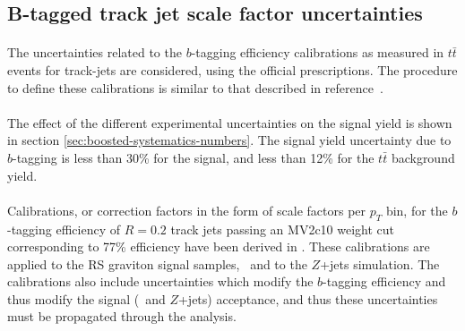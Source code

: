 \subsection{B-tagged track jet scale factor uncertainties}
\label{sec:b-tagging-unc}

\paragraph{}
The uncertainties related to the $b$-tagging efficiency calibrations as measured in $t\bar{t}$ events for track-jets are considered, using the official prescriptions. 
The procedure to define these calibrations is similar to that described in reference~\cite{Aad:2015ydr}.

\paragraph{}
The effect of the different experimental uncertainties on the signal yield is shown in section \ref{sec:boosted-systematics-numbers}. 
The signal yield uncertainty due to $b$-tagging is less than 30\% for the signal, and less than 12\% for the $t\bar{t}$ background yield.

\paragraph{}
Calibrations, or correction factors in the form of scale factors per $p_{T}$ bin, for the $b$-tagging efficiency of $R=0.2$ track jets passing an MV2c10 weight cut corresponding to 77\% efficiency have been derived in \cite{ATL-COM-PHYS-2015-009,ATL-COM-PHYS-2015-1323}.  These calibrations are applied to the RS graviton signal samples, \ttbar\ and to the $Z$+jets simulation.  The calibrations also include uncertainties which modify the $b$-tagging efficiency and thus modify the signal (\ttbar\ and $Z$+jets) acceptance, and thus these uncertainties must be  propagated through the analysis. 

